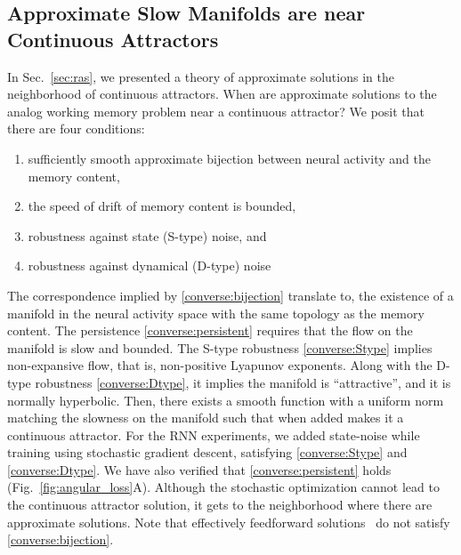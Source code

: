 \documentclass{article} %
\newcounter{ct}
\theoremstyle{definition}
\theoremstyle{remark}
\begin{document}
\subsection{Approximate Slow Manifolds are near Continuous Attractors}\label{sec:converse}
In Sec.~\ref{sec:ras}, we presented a theory of approximate solutions in the neighborhood of continuous attractors.
When are approximate solutions to the analog working memory problem near a continuous attractor?
We posit that there are four conditions:
\begin{enumerate}[label=\textbf{(C\arabic*)}]
\item sufficiently smooth approximate bijection between neural activity and the memory content, \label{converse:bijection}
\item the speed of drift of memory content is bounded, \label{converse:persistent}
\item robustness against state (S-type) noise, and \label{converse:Stype}
\item robustness against dynamical (D-type) noise \label{converse:Dtype}
\end{enumerate}
The correspondence implied by \ref{converse:bijection} translate to, the existence of a manifold in the neural activity space with the same topology as the memory content.
The persistence \ref{converse:persistent} requires that the flow on the manifold is slow and bounded.
The S-type robustness \ref{converse:Stype} implies non-expansive flow, that is, non-positive Lyapunov exponents.
Along with the D-type robustness \ref{converse:Dtype}, it implies the manifold is ``attractive'', and it is normally hyperbolic.
Then, there exists a smooth function with a uniform norm matching the slowness on the manifold such that when added makes it a continuous attractor.
For the RNN experiments, we added state-noise while training using stochastic gradient descent, satisfying \ref{converse:Stype} and \ref{converse:Dtype}.
We have also verified that \ref{converse:persistent} holds (Fig.~\ref{fig:angular_loss}A).
Although the stochastic optimization cannot lead to the continuous attractor solution, it gets to the neighborhood where there are approximate solutions.
Note that effectively feedforward solutions~\citep{Goldman2009} do not satisfy \ref{converse:bijection}.
\end{document}
